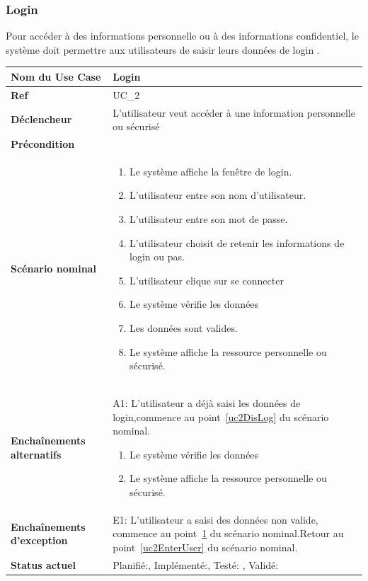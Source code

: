 		\subsubsection{Login}
			Pour accéder à des informations personnelle ou à des informations confidentiel, le système doit permettre aux utilisateurs de saisir leurs données de login .\\[0.2cm]
			\begin{longtable}{|l|p{10cm}|}
				\hline \textbf{Nom du Use Case} & Login \\ 
				\hline \textbf{Ref} & UC\_2  \\ 
				\hline \textbf{Déclencheur} & L'utilisateur veut accéder à une information personnelle ou sécurisé \\
				\hline \textbf{Précondition} &  \\
				\hline \textbf{Scénario nominal} & 
				\begin{enumerate}
					\item \label{uc2DisLog} Le système affiche la fenêtre de login.
					\item \label{uc2EnterUser} L'utilisateur entre son nom d'utilisateur.
					\item L'utilisateur entre son mot de passe.
					\item L'utilisateur choisit de retenir les informations de login ou pas.
					\item L'utilisateur clique sur se connecter
					\item Le système vérifie les données 
					\item \label{uc2DataValid}Les données sont valides.
					\item Le système affiche la ressource personnelle ou sécurisé. 
				\end{enumerate}
				\\ 
				\hline \textbf{Enchaînements alternatifs} & 
				A1: L'utilisateur a déjà saisi les données de login,commence au point~\ref{uc2DisLog} du scénario nominal.
					\begin{enumerate}
						\item Le système vérifie les données 
						\item Le système affiche la ressource personnelle ou sécurisé. 
					\end{enumerate}
					\\ 
				\hline \textbf{Enchaînements d'exception} & 
				E1: L'utilisateur a saisi des données non valide, commence au point~\ref{uc2DataValid} du scénario nominal.Retour au point~\ref{uc2EnterUser} du scénario nominal.
					\\ 
				\hline \textbf{Status actuel} & Planifié:\Square  , Implémenté:\Square , Testé: \Square , Validé: \Square \\
				\hline 
			\end{longtable} 
